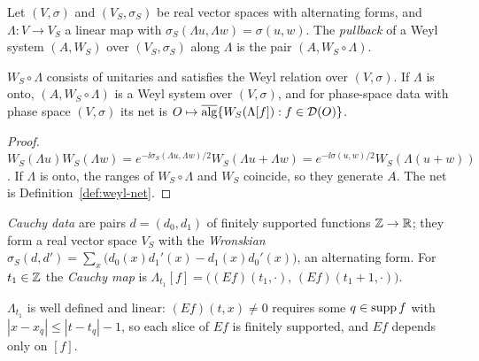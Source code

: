 \begin{definition}\label{def:pullback}
Let $(V,\sigma)$ and $(V_S,\sigma_S)$ be real vector spaces with alternating forms, and
$\Lambda:V\to V_S$ a linear map with $\sigma_S(\Lambda u,\Lambda w)=\sigma(u,w)$. The
\emph{pullback} of a Weyl system $(A,W_S)$ over $(V_S,\sigma_S)$ along $\Lambda$ is the pair
$(A,W_S\circ\Lambda)$.
\end{definition}

\begin{proposition}[Pullback]\label{prop:pullback}
$W_S\circ\Lambda$ consists of unitaries and satisfies the Weyl relation over $(V,\sigma)$. If
$\Lambda$ is onto, $(A,W_S\circ\Lambda)$ is a Weyl system over $(V,\sigma)$, and for phase-space
data with phase space $(V,\sigma)$ its net is $O\mapsto\overline{\operatorname{alg}}\{W_S(\Lambda[f]):f\in\mathcal D(O)\}$.
\end{proposition}
\begin{proof}
$W_S(\Lambda u)W_S(\Lambda w)=e^{-\ii\sigma_S(\Lambda u,\Lambda w)/2}W_S(\Lambda u+\Lambda w)
=e^{-\ii\sigma(u,w)/2}W_S(\Lambda(u+w))$. If $\Lambda$ is onto, the ranges of $W_S\circ\Lambda$
and $W_S$ coincide, so they generate $A$. The net is Definition~\ref{def:weyl-net}.
\end{proof}
\noindent{}

\begin{definition}\label{def:cauchy-map}
\emph{Cauchy data} are pairs $d=(d_0,d_1)$ of finitely supported functions $\mathbb Z\to\mathbb R$; they form a
real vector space $V_S$ with the \emph{Wronskian}
$\sigma_S(d,d')=\sum_x\bigl(d_0(x)d_1'(x)-d_1(x)d_0'(x)\bigr)$, an alternating form. For
$t_1\in\mathbb Z$ the \emph{Cauchy map} is
$\Lambda_{t_1}[f]=\bigl((Ef)(t_1,\cdot),\,(Ef)(t_1+1,\cdot)\bigr)$.
\end{definition}
\noindent $\Lambda_{t_1}$ is well defined and linear: $(Ef)(t,x)\neq0$ requires some $q\in\operatorname{supp} f$
with $|x-x_q|\leq|t-t_q|-1$, so each slice of $Ef$ is finitely supported, and $Ef$ depends only on
$[f]$. 

